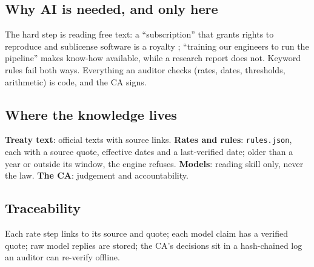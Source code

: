 \documentclass[10pt,a4paper]{article}
\begin{document}
\begin{minipage}[t]{0.485\linewidth}
\subsection{Why AI is needed, and only here}
The hard step is reading free text: a ``subscription'' that grants rights to reproduce and sublicense software is a royalty \cite{ea}; ``training our engineers to run the pipeline'' makes know-how available, while a research report does not. Keyword rules fail both ways. Everything an auditor checks (rates, dates, thresholds, arithmetic) is code, and the CA signs.
\subsection{Where the knowledge lives}
\textbf{Treaty text}: official texts with source links. \textbf{Rates and rules}: \texttt{rules.json}, each with a source quote, effective dates and a last-verified date; older than a year or outside its window, the engine refuses. \textbf{Models}: reading skill only, never the law. \textbf{The CA}: judgement and accountability.
\subsection{Traceability}
Each rate step links to its source and quote; each model claim has a verified quote; raw model replies are stored; the CA's decisions sit in a hash-chained log an auditor can re-verify offline.
\end{minipage}
\end{document}

